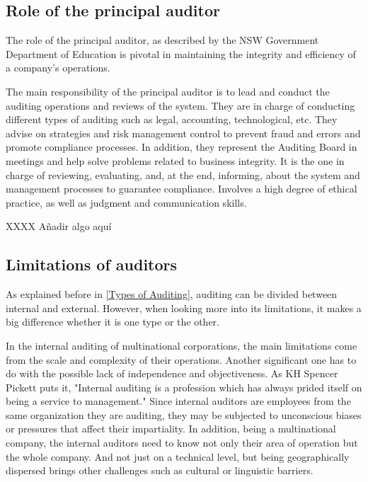 \subsection{Role of the principal auditor}

The role of the principal auditor, as described by the NSW Government Department of Education \cite{PrincipalAuditorNSW} is pivotal in maintaining the integrity and efficiency of a company's operations. 

The main responsibility of the principal auditor is to lead and conduct the auditing operations and reviews of the system. They are in charge of conducting different types of auditing such as legal, accounting, technological, etc. They advise on strategies and risk management control to prevent fraud and errors and promote compliance processes. 
In addition, they represent the Auditing Board in meetings and help solve problems related to business integrity. It is the one in charge of reviewing, evaluating, and, at the end, informing, about the system and management processes to guarantee compliance. Involves a high degree of ethical practice, as well as judgment and communication skills. 


XXXX Añadir algo aquí 



\subsection{Limitations of auditors}

As explained before in \cref{Types of Auditing}, auditing can be divided between internal and external. However, when looking more into its limitations, it makes a big difference whether it is one type or the other.

In the internal auditing of multinational corporations, the main limitations come from the scale and complexity of their operations. Another significant one has to do with the possible lack of independence and objectiveness. As KH Spencer Pickett \cite{definitionInternalAuditing} puts it, "Internal auditing is a profession which has always prided itself on being a service to management." Since internal auditors are employees from the same organization they are auditing, they may be subjected to unconscious biases or pressures that affect their impartiality. In addition, being a multinational company, the internal auditors need to know not only their area of operation but the whole company. And not just on a technical level, but being geographically dispersed brings other challenges such as cultural or linguistic barriers. 

